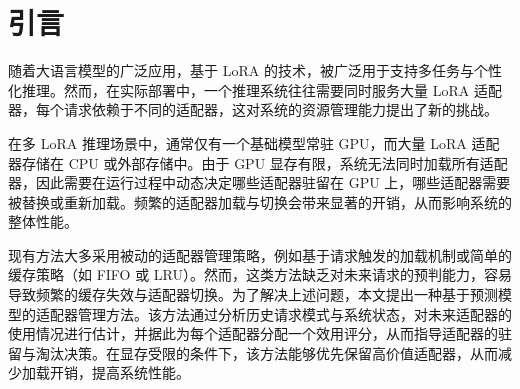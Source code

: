 \section{引言}
随着大语言模型的广泛应用，基于 LoRA 的技术，被广泛用于支持多任务与个性化推理。然而，在实际部署中，一个推理系统往往需要同时服务大量 LoRA 适配器，每个请求依赖于不同的适配器，这对系统的资源管理能力提出了新的挑战。

在多 LoRA 推理场景中，通常仅有一个基础模型常驻 GPU，而大量 LoRA 适配器存储在 CPU 或外部存储中。由于 GPU 显存有限，系统无法同时加载所有适配器，因此需要在运行过程中动态决定哪些适配器驻留在 GPU 上，哪些适配器需要被替换或重新加载。频繁的适配器加载与切换会带来显著的开销，从而影响系统的整体性能。

现有方法大多采用被动的适配器管理策略，例如基于请求触发的加载机制或简单的缓存策略（如 FIFO 或 LRU）。然而，这类方法缺乏对未来请求的预判能力，容易导致频繁的缓存失效与适配器切换。为了解决上述问题，本文提出一种基于预测模型的适配器管理方法。该方法通过分析历史请求模式与系统状态，对未来适配器的使用情况进行估计，并据此为每个适配器分配一个效用评分，从而指导适配器的驻留与淘汰决策。在显存受限的条件下，该方法能够优先保留高价值适配器，从而减少加载开销，提高系统性能。

